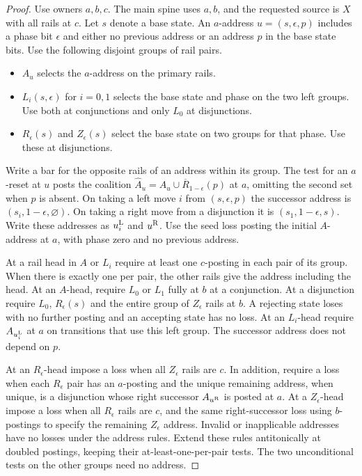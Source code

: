\begin{proof}
Use owners $a,b,c$. The main spine uses $a,b$, and the requested
source is $X$ with all rails at $c$. Let $s$ denote a base state.
An $a$-address $u=(s,\epsilon,p)$ includes a phase bit $\epsilon$ and
either no previous address or an address $p$ in the base state bits.
Use the following disjoint groups of rail pairs.
\begin{itemize}
\item $A_u$ selects the $a$-address on the primary rails.
\item $L_i(s,\epsilon)$ for $i=0,1$ selects the base state and phase
on the two left groups. Use both at conjunctions and only $L_0$ at
disjunctions.
\item $R_\epsilon(s)$ and $Z_\epsilon(s)$ select the base state on
two groups for that phase. Use these at disjunctions.
\end{itemize}
Write a bar for the opposite rails of an address within its group.
The test for an $a$-reset at $u$ posts the coalition
$\widehat A_u=A_u\cup\overline R_{1-\epsilon}(p)$ at $a$, omitting
the second set when $p$ is absent. On taking a left move $i$ from
$(s,\epsilon,p)$ the successor address is
$(s_i,1-\epsilon,\varnothing)$. On taking a right move from a
disjunction it is $(s_1,1-\epsilon,s)$. Write these addresses as
$u_i^{\rm L}$ and $u^{\rm R}$. Use the seed loss posting the initial
$A$-address at $a$, with phase zero and no previous address.

At a rail head in $A$ or $L_i$ require at least one $c$-posting in
each pair of its group. When there is exactly one per pair, the
other rails give the address including the head. At an $A$-head,
require $L_0$ or $L_1$ fully at $b$ at a conjunction. At a
disjunction require $L_0$, $R_\epsilon(s)$ and the entire group
of $Z_\epsilon$ rails at $b$. A rejecting state loses with no
further posting and an accepting state has no loss. At an
$L_i$-head require $A_{u_i^{\rm L}}$ at $a$ on transitions that use
this left group. The successor address does not depend on $p$.

At an $R_\epsilon$-head impose a loss when all $Z_\epsilon$ rails
are $c$. In addition, require a loss when each $R_\epsilon$ pair
has an $a$-posting and the unique remaining address, when unique,
is a disjunction whose right successor $A_{u^{\rm R}}$ is posted
at $a$. At a $Z_\epsilon$-head impose a loss when all
$R_\epsilon$ rails are $c$, and the same right-successor loss
using $b$-postings to specify the remaining $Z_\epsilon$ address.
Invalid or inapplicable addresses have no losses under the address
rules. Extend these rules antitonically at doubled postings, keeping
their at-least-one-per-pair tests. The two unconditional tests on
the other groups need no address.


\end{proof}
